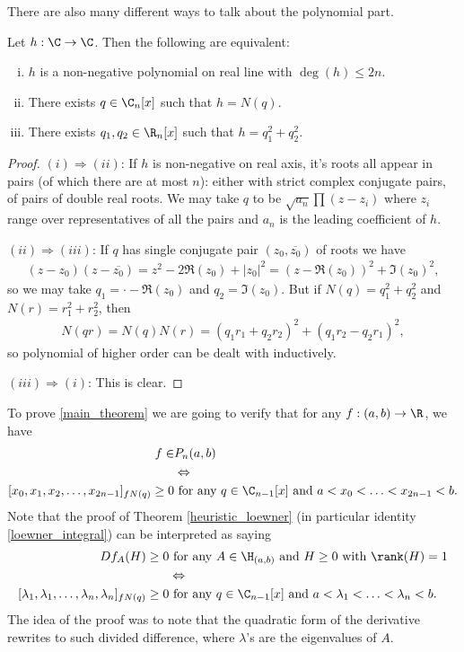 There are also many different ways to talk about the polynomial part.
\begin{lem}\label{polynomial_lemma}
	Let $h : \C \to \C$. Then the following are equivalent:
	\begin{enumerate}[(i)]
		\item $h$ is a non-negative polynomial on real line with  $\deg(h) \leq 2 n$.
		\item There exists $q \in \C_{n}[x]$ such that $h = N(q)$.
		\item There exists $q_{1}, q_{2} \in \R_{n}[x]$ such that $h = q_{1}^2 + q_{2}^2$.
	\end{enumerate}
\end{lem}
\begin{proof}
	$(i) \Rightarrow (ii)$: If $h$ is non-negative on real axis, it's roots all appear in pairs (of which there are at most $n$): either with strict complex conjugate pairs, of pairs of double real roots. We may take $q$ to be $\sqrt{a_{n}}\prod (z - z_{i})$ where $z_{i}$ range over representatives of all the pairs and $a_{n}$ is the leading coefficient of $h$.

	$(ii) \Rightarrow (iii)$: If $q$ has single conjugate pair $(z_{0}, \overline{z_{0}})$ of roots we have
	\begin{align*}
		(z - z_{0}) (z - \overline{z_{0}}) = z^2 - 2 \Re(z_{0}) + |z_{0}|^2 = (z - \Re(z_{0}))^2 + \Im(z_{0})^2,
	\end{align*}
	so we may take $q_{1} = \cdot - \Re(z_{0})$ and $q_{2} = \Im(z_{0})$. But if $ N(q) = q_{1}^2 + q_{2}^2$ and $ N(r) = r_{1}^2 + r_{2}^2$, then
	\begin{align*}
		N(q r) = N(q) N(r) = (q_{1} r_{1} + q_{2} r_{2})^2 + (q_{1} r_{2} - q_{2} r_{1})^2,
	\end{align*}
	so polynomial of higher order can be dealt with inductively.

	$(iii) \Rightarrow (i)$: This is clear.
\end{proof}

To prove \ref{main_theorem} we are going to verify that for any $f : (a, b) \to \R$, we have 
\begin{align*}
	f \in & P_{n}(a, b) \\
	&\Leftrightarrow \\
	[x_{0}, x_{1}, x_{2}, \ldots, x_{2 n - 1}]_{f N(q)} \geq 0 &\text{ for any $q \in \C_{n - 1}[x]$ and $a < x_{0} < \ldots < x_{2 n - 1} < b$}.
\end{align*}
Note that the proof of Theorem \ref{heuristic_loewner} (in particular identity \ref{loewner_integral}) can be interpreted as saying
\begin{align*}
	D f_{A}(H) \geq 0 &\text{ for any $A \in \H_{(a, b)}$ and $H \geq 0$ with $\rank(H) = 1$} \\
	&\Leftrightarrow \\
	[\lambda_{1}, \lambda_{1}, \ldots, \lambda_{n}, \lambda_{n}]_{f N(q)} \geq 0 &\text{ for any $q \in \C_{n - 1}[x]$ and $a < \lambda_{1} < \ldots < \lambda_{n} < b$}.
\end{align*}
The idea of the proof was to note that the quadratic form of the derivative rewrites to such divided difference, where $\lambda$'s are the eigenvalues of $A$.

